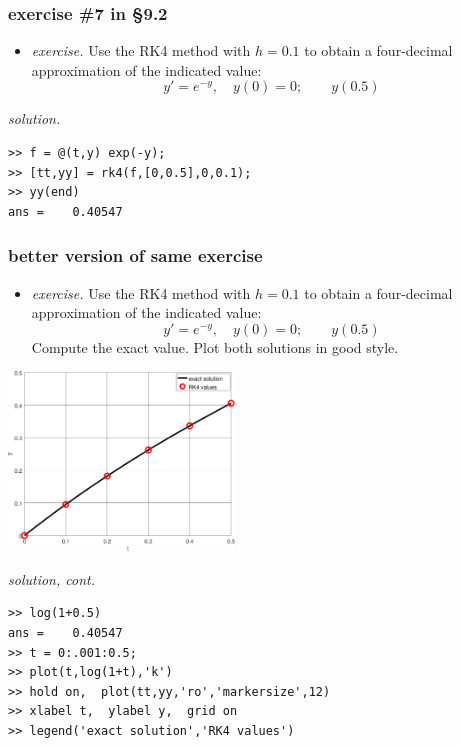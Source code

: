 \documentclass[urlcolor=blue,dvipsnames]{beamer}
\begin{document}
\begin{frame}[fragile]
\frametitle{exercise \#7 in \S9.2}

\begin{itemize}
\item \emph{exercise.}  Use the RK4 method with $h=0.1$ to obtain a four-decimal approximation of the indicated value:
    $$y' = e^{-y}, \quad y(0)=0; \qquad y(0.5)$$
\end{itemize}

\noindent \emph{solution.}
\begin{Verbatim}[fontsize=\footnotesize]
>> f = @(t,y) exp(-y);
>> [tt,yy] = rk4(f,[0,0.5],0,0.1);
>> yy(end)
ans =    0.40547
\end{Verbatim}

\end{frame}


\begin{frame}[fragile]
\frametitle{better version of same exercise}

\begin{itemize}
\item \emph{exercise.}  Use the RK4 method with $h=0.1$ to obtain a four-decimal approximation of the indicated value:
    $$y' = e^{-y}, \quad y(0)=0; \qquad y(0.5)$$
Compute the exact value.  Plot both solutions in good style.
\end{itemize}

\hfill \includegraphics[width=0.45\textwidth]{figs/exer7s9p2}

\vspace{-40mm}
\noindent \emph{solution, cont.}

\vspace{20mm}
\begin{Verbatim}[fontsize=\footnotesize]
>> log(1+0.5)
ans =    0.40547
>> t = 0:.001:0.5;
>> plot(t,log(1+t),'k')
>> hold on,  plot(tt,yy,'ro','markersize',12)
>> xlabel t,  ylabel y,  grid on
>> legend('exact solution','RK4 values')
\end{Verbatim}

\end{frame}
\end{document}
